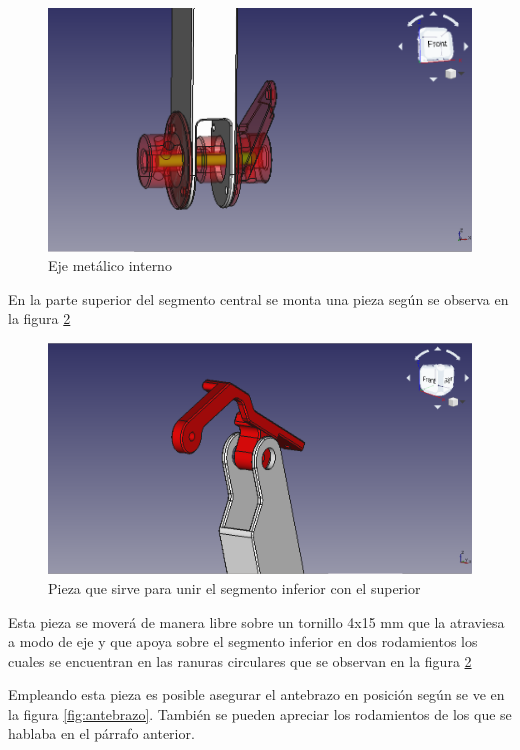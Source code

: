 \begin{figure}[H]
    \centering 
    \includegraphics[width=1\linewidth]{pictures/EjeInterno.png}
    \caption{Eje metálico interno}
    \label{fig:eje_metalico_interno}
\end{figure}

En la parte superior del segmento central se monta una pieza según se observa en la figura \ref{fig:pieza_forma_rara}

\begin{figure}[H]
    \centering 
    \includegraphics[width=1\linewidth]{pictures/PiezaConFormaRara.png}
    \caption{Pieza que sirve para unir el segmento inferior con el superior}
    \label{fig:pieza_forma_rara}
\end{figure}

Esta pieza se moverá de manera libre sobre un tornillo 4x15 mm que la atraviesa a modo de eje y que apoya sobre el segmento inferior en dos rodamientos los cuales se encuentran en las ranuras circulares que se observan en la figura \ref{fig:pieza_forma_rara}

Empleando esta pieza es posible asegurar el antebrazo en posición según se ve en la figura \ref{fig:antebrazo}. También se pueden apreciar los rodamientos de los que se hablaba en el párrafo anterior.


